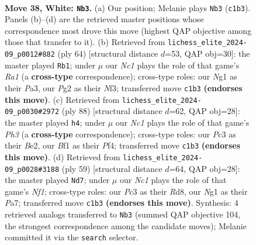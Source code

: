 \documentclass[11pt]{article}
\begin{document}
\clearpage

\begin{figure}[p]\centering
\begin{subfigure}{0.46\textwidth}\centering
\resizebox{\linewidth}{!}{%
\newchessgame
\chessboard[
  setfen={5r2/4r1k1/1p6/p1p1nb2/P5p1/2P1R3/K5PP/2N2BNR w - - 4 38},
  showmover=false,
  pgfstyle=straightmove, color=movearrow, markmove={c1-b3}
]}
\caption{}
\end{subfigure}\hfill
\begin{subfigure}{0.46\textwidth}\centering
\resizebox{\linewidth}{!}{%
\newchessgame
\chessboard[
  setfen={6r1/1pp4k/3p4/P2P4/2P1Rnr1/P4N1p/7P/R4K2 w - - 0 33},
  showmover=false,
  pgfstyle=straightmove, color=movearrow, markmove={a1-b1}
]}
\caption{}
\end{subfigure}
\\[4pt]
\begin{subfigure}{0.46\textwidth}\centering
\resizebox{\linewidth}{!}{%
\newchessgame
\chessboard[
  setfen={r2r1k2/5p2/2b1pN1p/p3P3/1nP2P2/R3K2P/1R2B3/8 w - - 1 45},
  showmover=false,
  pgfstyle=straightmove, color=movearrow, markmove={h3-h4}
]}
\caption{}
\end{subfigure}\hfill
\begin{subfigure}{0.46\textwidth}\centering
\resizebox{\linewidth}{!}{%
\newchessgame
\chessboard[
  setfen={2rr1n2/ppN5/6k1/3PPp1p/5Pp1/6P1/PP3K2/2R4R b - - 0 30},
  showmover=false,
  pgfstyle=straightmove, color=movearrow, markmove={f8-d7}
]}
\caption{}
\end{subfigure}
\caption{\textbf{Move 38, White: \texttt{Nb3}.} (a) Our position; Melanie plays \texttt{Nb3} (\texttt{c1b3}). Panels (b)--(d) are the retrieved master positions whose correspondence most drove this move (highest QAP objective among those that transfer to it). (b) Retrieved from \texttt{lichess\_elite\_2024-09\_p0012\#882} (ply 64) [structural distance $d$=53, QAP obj=30]: the master played \texttt{Rb1}; under $\mu$ our \emph{Nc1} plays the role of that game's \emph{Ra1} (a \textbf{cross-type} correspondence); cross-type roles: our \emph{N}g1 as their \emph{P}a3, our \emph{P}g2 as their \emph{N}f3; transferred move \texttt{c1b3} \textbf{(endorses this move)}. (c) Retrieved from \texttt{lichess\_elite\_2024-09\_p0030\#2972} (ply 88) [structural distance $d$=62, QAP obj=28]: the master played \texttt{h4}; under $\mu$ our \emph{Nc1} plays the role of that game's \emph{Ph3} (a \textbf{cross-type} correspondence); cross-type roles: our \emph{P}c3 as their \emph{B}e2, our \emph{B}f1 as their \emph{P}f4; transferred move \texttt{c1b3} \textbf{(endorses this move)}. (d) Retrieved from \texttt{lichess\_elite\_2024-09\_p0028\#3188} (ply 59) [structural distance $d$=64, QAP obj=28]: the master played \texttt{Nd7}; under $\mu$ our \emph{Nc1} plays the role of that game's \emph{Nf1}; cross-type roles: our \emph{P}c3 as their \emph{R}d8, our \emph{N}g1 as their \emph{P}a7; transferred move \texttt{c1b3} \textbf{(endorses this move)}. Synthesis: 4 retrieved analogs transferred to \texttt{Nb3} (summed QAP objective 104, the strongest correspondence among the candidate moves); Melanie committed it via the \texttt{search} selector.}
\label{fig:thought-m74}
\end{figure}
\end{document}
